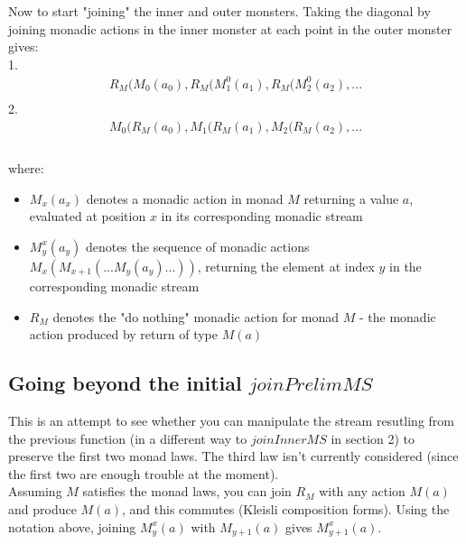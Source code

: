 \documentclass{article}
\begin{document}
Now to start "joining" the inner and outer monsters. Taking the diagonal by joining monadic actions in the inner monster at each point in the outer monster gives:\\
\vspace{1cm}
1.
\begin{align*}
	R_M ( M_0 (a_0), R_M ( M^0_1 (a_1), R_M ( M^0_2 (a_2), ...\\
\end{align*}
2. 
\begin{align*}
	M_0 ( R_M (a_0), M_1 ( R_M (a_1), M_2 ( R_M (a_2), ...\\
\end{align*}
\\
where: 
\begin{itemize}
	\item{$M_x (a_x)$ denotes a monadic action in monad $M$ returning a value $a$, evaluated at position $x$ in its corresponding monadic stream}
	\item{$M^x_y (a_y)$ denotes the sequence of monadic actions $M_x ( M_{x+1} (... M_y ( a_y ) ... ) )$, returning the element at index $y$ in the corresponding monadic stream}
	\item{$R_M$ denotes the "do nothing" monadic action for monad $M$ - the monadic action produced by return of type $M (a)$}
\end{itemize}

\subsection{Going beyond the initial $ joinPrelimMS $}

This is an attempt to see whether you can manipulate the stream resutling from the previous function (in a different way to $ joinInnerMS $ in section 2) to preserve the first two monad laws. The third law isn't currently considered (since the first two are enough trouble at the moment).\\

Assuming $M$ satisfies the monad laws, you can join $R_M$ with any action $M (a)$ and produce $M (a)$, and this commutes (Kleisli composition forms). Using the notation above, joining $M^x_y (a)$ with $M_{y+1} (a)$ gives $M^x_{y+1} (a)$.\\
\end{document}
